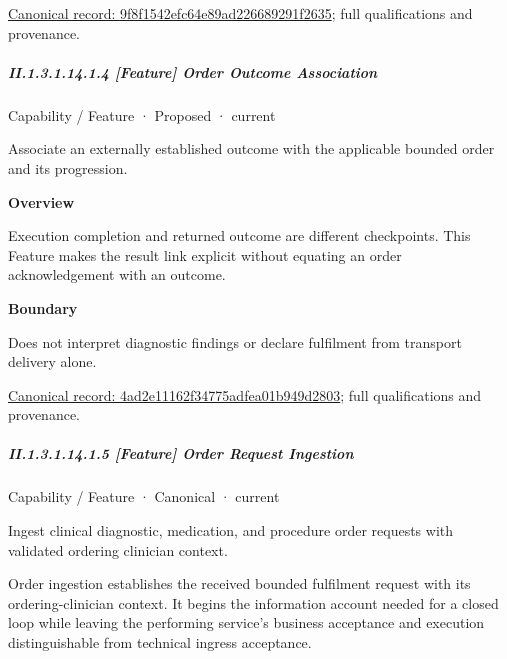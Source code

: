 {\footnotesize \href{../../../../../../../continuum/strategy/capability/feature/9f8f1542efc64e89ad226689291f2635.md}{Canonical record: 9f8f1542efc64e89ad226689291f2635}; full qualifications and provenance.}\par
\subparagraph*{II.1.3.1.14.1.4 [Feature] Order Outcome Association}
\label{navigation:II.1.3.1.14.1.4}

\label{element:4ad2e11162f34775adfea01b949d2803}
{\small Capability / Feature · Proposed · current}\par

Associate an externally established outcome with the applicable bounded order and its progression.



\textbf{Overview}



Execution completion and returned outcome are different checkpoints. This Feature makes the result link explicit without equating an order acknowledgement with an outcome.



\textbf{Boundary}



Does not interpret diagnostic findings or declare fulfilment from transport delivery alone.


{\footnotesize \href{../../../../../../../continuum/strategy/capability/feature/4ad2e11162f34775adfea01b949d2803.md}{Canonical record: 4ad2e11162f34775adfea01b949d2803}; full qualifications and provenance.}\par
\subparagraph*{II.1.3.1.14.1.5 [Feature] Order Request Ingestion}
\label{navigation:II.1.3.1.14.1.5}

\label{element:fc1f8168fd6949beb810e4ff57a2368e}
{\small Capability / Feature · Canonical · current}\par

Ingest clinical diagnostic, medication, and procedure order requests with validated ordering clinician context.



Order ingestion establishes the received bounded fulfilment request with its ordering-clinician context. It begins the information account needed for a closed loop while leaving the performing service's business acceptance and execution distinguishable from technical ingress acceptance.


